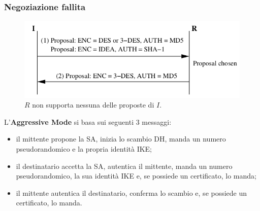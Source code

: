 \documentclass[11pt, a4paper, twoside, italian]{report}
\theoremstyle{plain}
\begin{document}
\begin{multicols}{2}
\subsubsection*{Negoziazione fallita}
\begin{figure}[H]
	\centering
	\includegraphics[scale=0.8]{fail}
	\caption*{$R$ non supporta nessuna delle proposte di $I$.}
\end{figure}
\end{multicols}

\newpage
L'\textbf{Aggressive Mode} si basa sui seguenti 3 messaggi:
\begin{itemize}
	\item il mittente propone la SA, inizia lo scambio DH, manda un numero pseudorandomico e la propria identità IKE;
	\item il destinatario accetta la SA, autentica il mittente, manda un numero pseudorandomico, la sua identità IKE e, se possiede un certificato, lo manda;
	\item il mittente autentica il destinatario, conferma lo scambio e, se possiede un certificato, lo manda.
\end{itemize}
\end{document}
